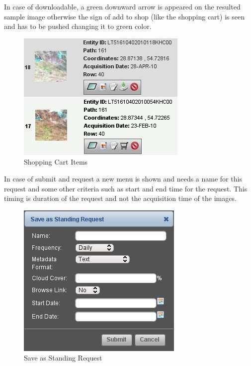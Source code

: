 In case of downloadable, a green downward arrow is appeared on the resulted sample image otherwise the sign of add to shop (like the shopping cart) is seen and has to be pushed changing it to green color.\newline

\begin{figure}[htbp]
   \centering
   \includegraphics[scale=0.5]{gipe004.png}
   \caption{Shopping Cart Items}
   \label{fig:gipe004}
\end{figure}

In case of submit and request a new menu is shown and needs a name for this request and some other criteria such as start and end time for the request. This timing is duration of the request and not the acquisition  time of the images. \newline

\begin{figure}[htbp]
   \centering
   \includegraphics[scale=0.4]{gipe005.png}
   \caption{Save as Standing Request}
   \label{fig:gipe005}
\end{figure}

